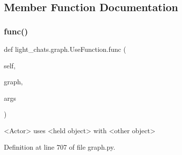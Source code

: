 \subsection{Member Function Documentation}
\mbox{\label{classlight__chats_1_1graph_1_1UseFunction_a75a1cb4d8d51f0336a3d5cd9f005e266}} 
\subsubsection{\texorpdfstring{func()}{func()}}
{\footnotesize\ttfamily def light\+\_\+chats.\+graph.\+Use\+Function.\+func (\begin{DoxyParamCaption}\item[{}]{self,  }\item[{}]{graph,  }\item[{}]{args }\end{DoxyParamCaption})}

\begin{DoxyVerb}<Actor> uses <held object> with <other object>
\end{DoxyVerb}
 

Definition at line 707 of file graph.\+py.


